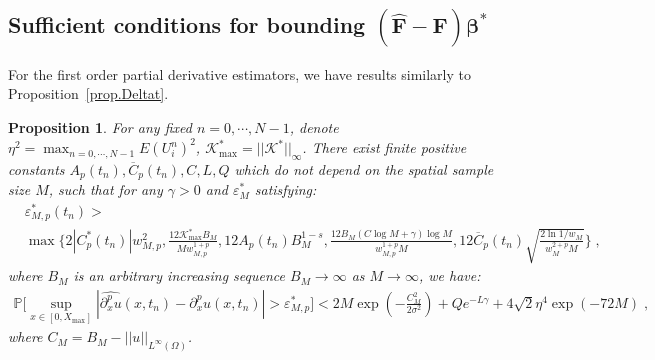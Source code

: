 \documentclass[a4paper,11pt]{article}
\newcommand{\bbeta}{\bm{\beta}}
\newcommand{\bF}{\mathbf{F}}
\newtheorem{prop}{Proposition}[section]
\theoremstyle{definition}
\begin{document}
\subsection{Sufficient conditions for bounding $(\widehat{\bF}-\bF)\bbeta^*$}
For the first order partial derivative estimators, we have results similarly to Proposition~\ref{prop.Deltat}.
\begin{prop}\label{prop.Dx}
For any fixed $n=0,\cdots,N-1$, denote $\eta^2 = \max_{n=0,\cdots,N-1}E(U_i^n)^2$, $\mathcal{K}^*_{\max}=||\mathcal{K}^*||_\infty$. There exist finite positive constants $A_p(t_n),\overline{C}_p(t_n),C,L,Q$ which do not depend on the spatial sample size $M$, such that for any $\gamma>0$ and $\varepsilon_M^*$ satisfying:
\begin{align*}
&\varepsilon_{M,p}^*(t_n)>\\
&\max\{2|C_p^*(t_n)|w_{M,p}^2,\frac{12\mathcal{K}^*_{\max}B_M}{Mw_{M,p}^{1+p}},12A_p(t_n)B_M^{1-s},\frac{12B_M(C\log M+\gamma)\log M}{w_{M,p}^{1+p}M},12\overline{C}_p(t_n)\sqrt{\frac{2\ln1/w_M}{w_M^{2+p}M}}\}\;,	
\end{align*}
where $B_M$ is an arbitrary increasing sequence $B_M\to\infty$ as $M\to\infty$, we have:
\begin{align*}
\mathbb{P}\Big[\sup_{x\in[0,X_{\max}]}|\widehat{\partial_x^pu}(x,t_n)-\partial_x^pu(x,t_n)|>\varepsilon_{M,p}^*\Big]<2M \exp(-\frac{C_M^2}{2\sigma^2})+Qe^{-L\gamma}+4\sqrt{2}\eta^4\exp(-72M)\;,
\end{align*}
where $C_M = B_M-||u||_{L^\infty(\Omega)}$.
\end{prop}
\end{document}
